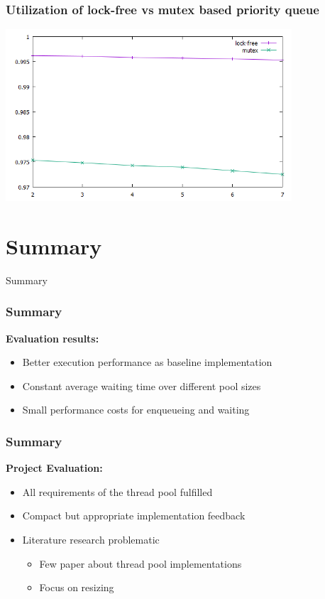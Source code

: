 \documentclass{beamer}
\begin{document}
\begin{frame}
	\frametitle{Utilization of lock-free vs mutex based priority queue}
	\begin{center}
		\includegraphics[width=0.8\textwidth]{img/lock_free.png}
	\end{center}
\end{frame}

\section{Summary}
\begin{frame}
	\begin{center}
		\huge Summary
	\end{center}
\end{frame}

\begin{frame}
	\frametitle{Summary}
	\textbf{Evaluation results:}
	\begin{itemize}
		\item Better execution performance as baseline implementation
		\item Constant average waiting time over different pool sizes
		\item Small performance costs for enqueueing and waiting
	\end{itemize}
\end{frame}

\begin{frame}
\frametitle{Summary}
	\textbf{Project Evaluation:}
	\begin{itemize}
		\item All requirements of the thread pool fulfilled
		\item Compact but appropriate implementation feedback
		\item Literature research problematic 
		\begin{itemize}
			\item Few paper about thread pool implementations
			\item Focus on resizing
		\end{itemize}
	\end{itemize}
\end{frame}
\end{document}
